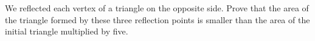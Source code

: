 We reflected each vertex of a triangle on the opposite side. Prove that the area of the triangle formed by these three reflection points is smaller than the area of the initial triangle multiplied by five.